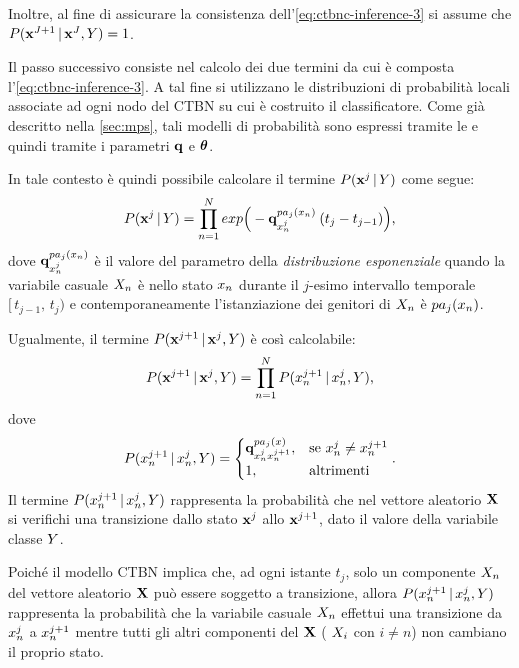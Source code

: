 Inoltre, al fine di assicurare la consistenza dell'\autoref{eq:ctbnc-inference-3} si assume che $P(\mathbf{x}^{J+1}\,\arrowvert\,\mathbf{x}^J,\mathnormal{Y})=1$.

Il passo successivo consiste nel calcolo dei due termini da cui è composta l'\autoref{eq:ctbnc-inference-3}. A tal fine si utilizzano le distribuzioni di probabilità locali associate ad ogni nodo del \acs{CTBN} su cui è costruito il classificatore. Come già descritto nella \autoref{sec:mps}, tali modelli di probabilità sono espressi tramite le \cim{} e quindi tramite i parametri $\boldsymbol{\textbf{\text{q}}}$ e $\boldsymbol{\textbf{\text{$\theta$}}}$.

In tale contesto è quindi possibile calcolare il termine $P(\mathbf{x}^j\,\arrowvert\,\mathnormal{Y})$ come segue:
\begin{equation}\label{eq:ctbnc-inference-4}
P(\mathbf{x}^j\,\arrowvert\,\mathnormal{Y})=\prod_{n=1}^N exp\Big(-\boldsymbol{\textbf{\text{q}}}_{\mathnormal{x}_n^j}^{pa_j(\mathnormal{x}_n)}\:(t_j - t_{j-1})\Big)\text{,}
\end{equation}
dove $\boldsymbol{\textbf{\text{q}}}_{\mathnormal{x}_n^j}^{pa_j(\mathnormal{x}_n)}$ è il valore del parametro della \emph{distribuzione esponenziale} quando la variabile casuale $\mathnormal{X}_n$ è nello stato $\mathnormal{x}_n$ durante il $j$-esimo intervallo temporale $[\,t_{j-1},\,t_j)$ e contemporaneamente l'istanziazione dei genitori di $\mathnormal{X}_n$ è $pa_j(\mathnormal{x}_n)$.

Ugualmente, il termine $P(\mathbf{x}^{j+1}\,\arrowvert\,\mathbf{x}^j,\mathnormal{Y})$ è così calcolabile:
\begin{equation}\label{eq:ctbnc-inference-5}
P(\mathbf{x}^{j+1}\,\arrowvert\,\mathbf{x}^j,\mathnormal{Y})=\prod_{n=1}^N P(\mathnormal{x}_n^{j+1}\,\arrowvert\,\mathnormal{x}_n^j,\mathnormal{Y})\text{,}
\end{equation}
dove
\begin{equation}\label{eq:ctbnc-inference-6}
P(\mathnormal{x}_n^{j+1}\,\arrowvert\,\mathnormal{x}_n^j,\mathnormal{Y})=
\begin{cases}
\boldsymbol{\textbf{\text{q}}}_{\mathnormal{x}_n^j\mathnormal{x}_n^{j+1}}^{pa_j(\mathnormal{x})}, & \text{se } \mathnormal{x}_n^j \neq \mathnormal{x}_n^{j+1} \\
1, & \text{altrimenti}
\end{cases}\text{.}
\end{equation}
Il termine $P(\mathnormal{x}_n^{j+1}\,\arrowvert\,\mathnormal{x}_n^j,\mathnormal{Y})$ rappresenta la probabilità che nel vettore aleatorio $\mathbf{X}$ si verifichi una transizione dallo stato $\mathbf{x}^j$ allo $\mathbf{x}^{j+1}$, dato il valore della variabile classe $\mathnormal{Y}$.

Poiché il modello \acs{CTBN} implica che, ad ogni istante $t_j$, solo un componente $\mathnormal{X}_n$ del vettore aleatorio $\mathbf{X}$ può essere soggetto a transizione, allora $P(\mathnormal{x}_n^{j+1}\,\arrowvert\,\mathnormal{x}_n^j,\mathnormal{Y})$ rappresenta la probabilità che la variabile casuale $\mathnormal{X}_n$ effettui una transizione da $\mathnormal{x}_n^j$ a $\mathnormal{x}_n^{j+1}$ mentre tutti gli altri componenti del  $\mathbf{X}$ (\ie{} $\mathnormal{X}_i$ con $i \neq n$) non cambiano il proprio stato.

